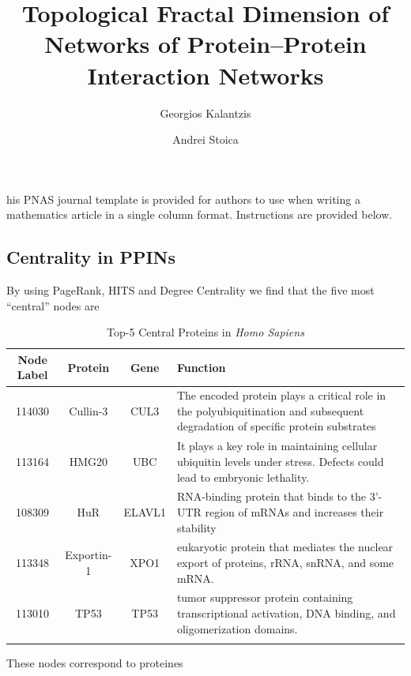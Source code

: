 \documentclass[9pt,twoside]{pnas-new}
\title{Topological  Fractal  Dimension  of  Networks  of Protein–Protein  Interaction  Networks}
\author[a]{Georgios Kalantzis}
\author[a]{Andrei Stoica}
\affil[a]{SABS, DTC}
\begin{document}
\maketitle
\thispagestyle{firststyle}

his PNAS journal template is provided for authors to use when writing a mathematics article in a single column format. Instructions are provided below.



\subsection*{Centrality in PPINs}
By using PageRank, HITS and Degree Centrality we find that the five most ``central'' nodes are

\begin{table}%
\centering
\caption{Top-5 Central Proteins in \textit{Homo Sapiens}}
\begin{tabular}{cccl}
Node Label & Protein & Gene & Function \\
\midrule
114030 & Cullin-3 & CUL3 & The encoded protein plays a critical role in the polyubiquitination and subsequent degradation of specific protein substrates \\
113164 & HMG20 &  UBC & It plays a key role in maintaining cellular ubiquitin levels under stress. Defects could lead to embryonic lethality. \\
108309 & HuR & ELAVL1 & RNA-binding protein that binds to the 3'-UTR region of mRNAs and increases their stability \\
113348 & Exportin-1 & XPO1 &  eukaryotic protein that mediates the nuclear export of proteins, rRNA, snRNA, and some mRNA. \\
113010 & TP53 & TP53 & tumor suppressor protein containing transcriptional activation, DNA binding, and oligomerization domains.  \\
\bottomrule
\label{tab:central}
\end{tabular}
\end{table}

These nodes correspond to proteines
\end{document}

